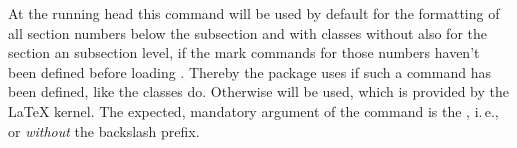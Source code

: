 \fi %


\ifshortversion\IgnoreThistrue{}\fi
\ifIgnoreThis %
\else %

\begin{Declaration}
\end{Declaration}
%
At the running head this command will be used by default for the formatting of
all section numbers below the subsection and with classes without
 also for the section an subsection level, if the mark commands
for those numbers haven't been defined before loading
. Thereby the package uses  if such
a command has been defined, like the \KOMAScript{} classes do. Otherwise
 will be used, which is provided by the \LaTeX{}
kernel. The expected, mandatory argument of the command is the , i.\,e.,  or 
\emph{without} the backslash prefix.

